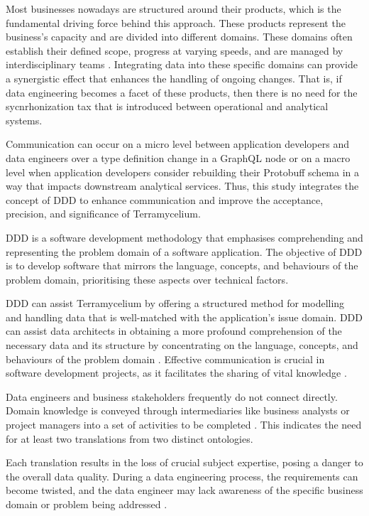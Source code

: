 \documentclass[preprint,12pt]{elsarticle}
\begin{document}
Most businesses nowadays are structured around their products, which is the fundamental driving force behind this approach. These products represent the business's capacity and are divided into different domains. These domains often establish their defined scope, progress at varying speeds, and are managed by interdisciplinary teams \cite{teamtopologiesSkelton}. Integrating data into these specific domains can provide a synergistic effect that enhances the handling of ongoing changes. That is, if data engineering becomes a facet of these products, then there is no need for the sycnrhonization tax that is introduced between operational and analytical systems.

Communication can occur on a micro level between application developers and data engineers over a type definition change in a GraphQL node or on a macro level when application developers consider rebuilding their Protobuff schema in a way that impacts downstream analytical services. Thus, this study integrates the concept of DDD to enhance communication and improve the acceptance, precision, and significance of Terramycelium.

DDD is a software development methodology that emphasises comprehending and representing the problem domain of a software application. The objective of DDD is to develop software that mirrors the language, concepts, and behaviours of the problem domain, prioritising these aspects over technical factors. 

DDD can assist Terramycelium by offering a structured method for modelling and handling data that is well-matched with the application's issue domain. DDD can assist data architects in obtaining a more profound comprehension of the necessary data and its structure by concentrating on the language, concepts, and behaviours of the problem domain \cite{DataMesh}. Effective communication is crucial in software development projects, as it facilitates the sharing of vital knowledge \cite{sudhakar2012model}. 

Data engineers and business stakeholders frequently do not connect directly. Domain knowledge is conveyed through intermediaries like business analysts or project managers into a set of activities to be completed \cite{khrononov2021learning}. This indicates the need for at least two translations from two distinct ontologies.

Each translation results in the loss of crucial subject expertise, posing a danger to the overall data quality. During a data engineering process, the requirements can become twisted, and the data engineer may lack awareness of the specific business domain or problem being addressed \cite{khononov2021learning}.
\end{document}
